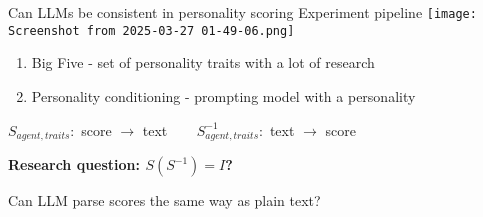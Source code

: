 \documentclass[12pt,pdf,hyperref={unicode}]{beamer}
\begin{document}
\begin{frame}{Can LLMs be consistent in personality scoring}
Experiment pipeline
	\texttt{[image: Screenshot from 2025-03-27 01-49-06.png]}  

\begin{enumerate}[1)]
    \item Big Five - set of personality traits with a lot of research
    \item Personality conditioning - prompting model with a personality
\end{enumerate}

     $S_{agent, traits}:$ score $\rightarrow$ text $ \ \ \ \ \ \ \ \ $$S_{agent, traits}^{-1}:$ text $\rightarrow$ score
    
\begin{center}
\textbf{Research question: $S(S^{-1}) = I$?}
\end{center}

\bigskip
Can LLM parse scores the same way as plain text?
\end{frame}
\end{document}
